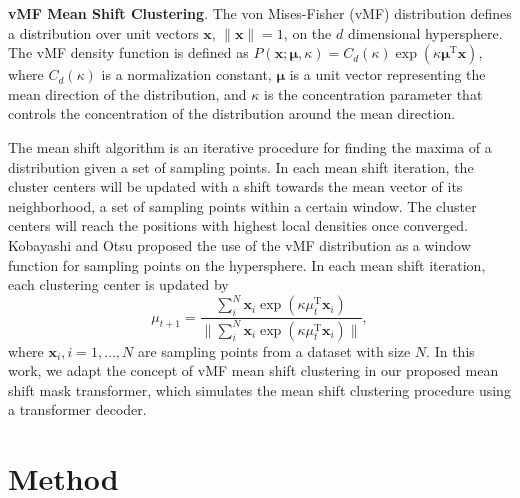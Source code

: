 \documentclass[letterpaper, 10 pt, conference]{ieeeconf}
\begin{document}
\textbf{vMF Mean Shift Clustering}. The von Mises-Fisher (vMF) \cite{mardia2000directional} distribution defines a distribution over unit vectors $\mathbf{x}$, $\| \mathbf{x} \|=1$, on the $d$ dimensional hypersphere. The vMF density function is defined as $P(\mathbf{x}; \mathbf{\mu}, \kappa) = C_{d}(\kappa) \exp \left(\kappa \mathbf{\mu}^\mathrm{T} \mathbf{x} \right)$, where $C_d(\kappa)$ is a normalization constant, $\mathbf{\mu}$ is a unit vector representing the mean direction of the distribution, and $\kappa$ is the concentration parameter that controls the concentration of the distribution around the mean direction. 

The mean shift algorithm is an iterative procedure for finding the maxima of a distribution given a set of sampling points. In each mean shift iteration, the cluster centers will be updated with a shift towards the mean vector of its neighborhood, a set of sampling points within a certain window. The cluster centers will reach the positions with highest local densities once converged. Kobayashi and Otsu \cite{Kobayashi2010} proposed the use of the vMF distribution as a window function for sampling points on the hypersphere. In each mean shift iteration, each clustering center is updated by 
\begin{equation} \label{msupdate}
\mu_{t+1} = \frac{\sum^N_i \mathbf{x}_i \exp \left(\kappa \mu_t^\mathrm{T} \mathbf{x}_i \right)}{\| \sum^N_i \mathbf{x}_i \exp \left(\kappa \mu_t^\mathrm{T} \mathbf{x}_i \right) \|},
\end{equation}
where $\mathbf{x}_i, i=1, \ldots, N$ are sampling points from a dataset with size $N$. In this work, we adapt the concept of vMF mean shift clustering in our proposed mean shift mask transformer, which simulates the mean shift clustering procedure using a transformer decoder.
\section{Method}
\end{document}
